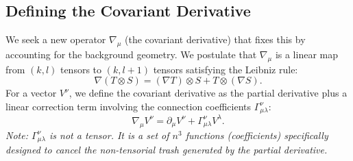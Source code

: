 \documentclass[11pt, a4paper]{report}
\begin{document}
\subsection*{Defining the Covariant Derivative}
We seek a new operator \(\nabla_\mu\) (the covariant derivative) that fixes this by accounting for the background geometry. We postulate that \(\nabla_\mu\) is a linear map from \((k, l)\) tensors to \((k, l+1)\) tensors satisfying the Leibniz rule:
\begin{equation}
\nabla (T \otimes S) = (\nabla T) \otimes S + T \otimes (\nabla S).
\end{equation}
For a vector \(V^\nu\), we define the covariant derivative as the partial derivative plus a linear correction term involving the connection coefficients \(\Gamma^\nu_{\mu\lambda}\):
\begin{equation}
\label{eq:cov_deriv_vector}
\nabla_\mu V^\nu = \partial_\mu V^\nu + \Gamma^\nu_{\mu\lambda} V^\lambda.
\end{equation}
\emph{Note: \(\Gamma^\nu_{\mu\lambda}\) is not a tensor. It is a set of \(n^3\) functions (coefficients) specifically designed to cancel the non-tensorial trash generated by the partial derivative.}
\end{document}
